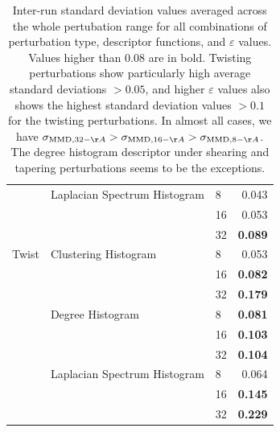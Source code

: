 \begin{table}
{\begin{tabular}{lllr}
    & Laplacian Spectrum Histogram & 8  &           0.043 \\
    &                              & 16 &           0.053 \\
    &                              & 32 &           \textbf{0.089} \\
    Twist & Clustering Histogram & 8  &           0.053 \\
    &                              & 16 &           \textbf{0.082} \\
    &                              & 32 &           \textbf{0.179} \\
    & Degree Histogram & 8  &           \textbf{0.081} \\
    &                              & 16 &           \textbf{0.103} \\
    &                              & 32 &           \textbf{0.104} \\
    & Laplacian Spectrum Histogram & 8  &           0.064 \\
    &                              & 16 &           \textbf{0.145} \\
    &                              & 32 &           \textbf{0.229} \\
    \bottomrule
  \end{tabular}
}
\caption[Inter-run standard deviation values averaged across the whole
pertubation range for all combinations of perturbation type, descriptor
functions, and $\varepsilon$ values.]{Inter-run standard deviation values
averaged across the whole pertubation range for all combinations of perturbation
type, descriptor functions, and $\varepsilon$ values. Values higher than $0.08$
are in bold. Twisting perturbations show particularly high average standard
deviations $>0.05$, and higher $\varepsilon$ values also shows the highest
standard deviation values $>0.1$ for the twisting perturbations. In almost all
cases, we have $\sigma_{\MMD, 32-\AA}>\sigma_{\MMD, 16-\AA}>\sigma_{\MMD,
8-\AA}$. The degree histogram descriptor under shearing and tapering
perturbations seems to be the exceptions.}
  \label{tab:std_dev_epsilon_influence}
\end{table}


